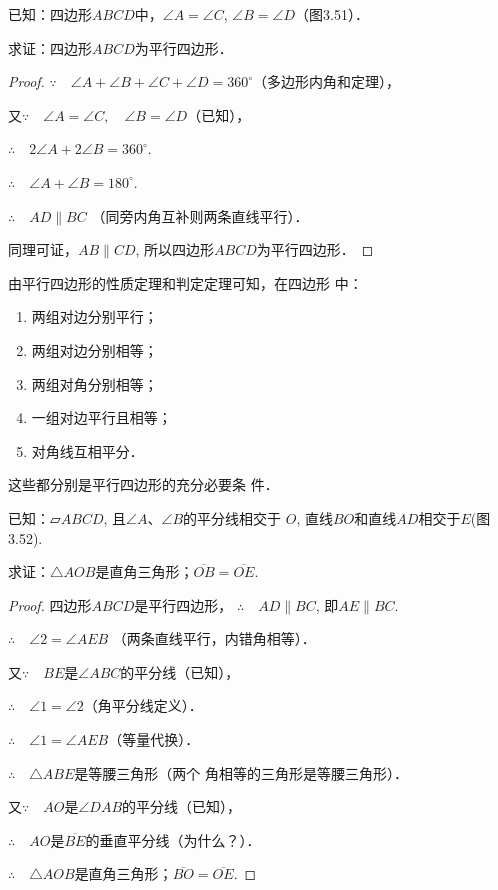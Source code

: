 已知：四边形$ABCD$中，$\angle A=\angle C$, $\angle B=\angle D$（图3.51）．

求证：四边形$ABCD$为平行四边形．

\begin{proof}
$\because\quad \angle A+\angle B+\angle C +\angle D=360^{\circ}$（多边形内角和定理），

又$\because\quad \angle A=\angle C,\quad\angle B=\angle D$（已知），

$\therefore\quad 2\angle A+2\angle B=360^{\circ}$.

$\therefore\quad \angle A+\angle B=180^{\circ}$.

$\therefore\quad AD\parallel BC$ （同旁内角互补则两条直线平行）．

同理可证，$AB\parallel CD$, 所以四边形$ABCD$为平行四边形．
\end{proof}

由平行四边形的性质定理和判定定理可知，在四边形
中：
\begin{enumerate}
    \item 两组对边分别平行；
    \item 两组对边分别相等；
    \item 两组对角分别相等；
    \item 一组对边平行且相等；
    \item 对角线互相平分．
\end{enumerate}
这些都分别是平行四边形的充分必要条
件．

\begin{example}
     已知：$\parallelogram ABCD$, 且$\angle A$、$\angle B$的平分线相交于
$O$, 直线$BO$和直线$AD$相交于$E$(图3.52).

求证：$\triangle AOB$是直角三角形；$\overline{OB}=\overline{OE}$.
\end{example}

\begin{proof}
四边形$ABCD$是平行四边形，
$\therefore\quad AD\parallel BC$, 即$AE\parallel BC$.

$\therefore\quad \angle 2=\angle AEB$ （两条直线平行，内错角相等）．

又$\because\quad BE$是$\angle ABC$的平分线（已知），

$\therefore\quad \angle 1=\angle 2$（角平分线定义）．

$\therefore\quad \angle 1=\angle AEB$（等量代换）．

$\therefore\quad \triangle ABE$是等腰三角形（两个
角相等的三角形是等腰三角形）．

又$\because\quad AO$是$\angle DAB$的平分线（已知），

$\therefore\quad AO$是$\overline{BE}$的垂直平分线（为什么？）．

$\therefore\quad \triangle AOB$是直角三角形；$\overline{BO}=\overline{OE}$.
\end{proof}

